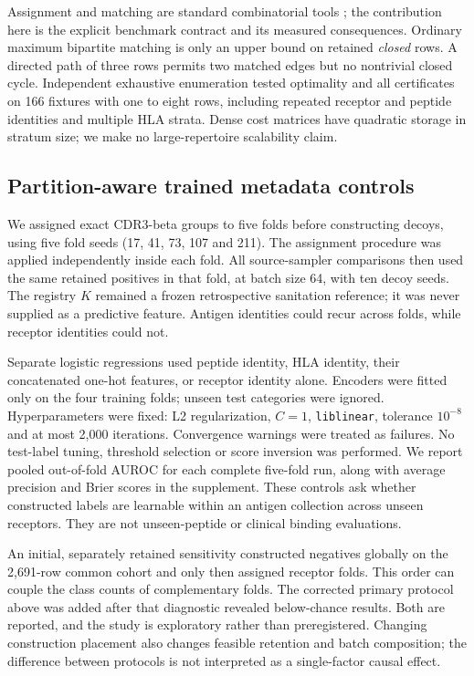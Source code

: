 \documentclass[pdflatex,sn-basic]{sn-jnl}
\begin{document}
Assignment and matching are standard combinatorial tools \citep{Hall1935}; the contribution here is the explicit benchmark contract and its measured consequences. Ordinary maximum bipartite matching is only an upper bound on retained \emph{closed} rows. A directed path of three rows permits two matched edges but no nontrivial closed cycle. Independent exhaustive enumeration tested optimality and all certificates on 166 fixtures with one to eight rows, including repeated receptor and peptide identities and multiple HLA strata. Dense cost matrices have quadratic storage in stratum size; we make no large-repertoire scalability claim.

\subsection{Partition-aware trained metadata controls}
We assigned exact CDR3-beta groups to five folds before constructing decoys, using five fold seeds (17, 41, 73, 107 and 211). The assignment procedure was applied independently inside each fold. All source-sampler comparisons then used the same retained positives in that fold, at batch size 64, with ten decoy seeds. The registry $K$ remained a frozen retrospective sanitation reference; it was never supplied as a predictive feature. Antigen identities could recur across folds, while receptor identities could not.

Separate logistic regressions used peptide identity, HLA identity, their concatenated one-hot features, or receptor identity alone. Encoders were fitted only on the four training folds; unseen test categories were ignored. Hyperparameters were fixed: L2 regularization, $C=1$, \texttt{liblinear}, tolerance $10^{-8}$ and at most 2,000 iterations. Convergence warnings were treated as failures. No test-label tuning, threshold selection or score inversion was performed. We report pooled out-of-fold AUROC for each complete five-fold run, along with average precision and Brier scores in the supplement. These controls ask whether constructed labels are learnable within an antigen collection across unseen receptors. They are not unseen-peptide or clinical binding evaluations.

An initial, separately retained sensitivity constructed negatives globally on the 2,691-row common cohort and only then assigned receptor folds. This order can couple the class counts of complementary folds. The corrected primary protocol above was added after that diagnostic revealed below-chance results. Both are reported, and the study is exploratory rather than preregistered. Changing construction placement also changes feasible retention and batch composition; the difference between protocols is not interpreted as a single-factor causal effect.
\end{document}
